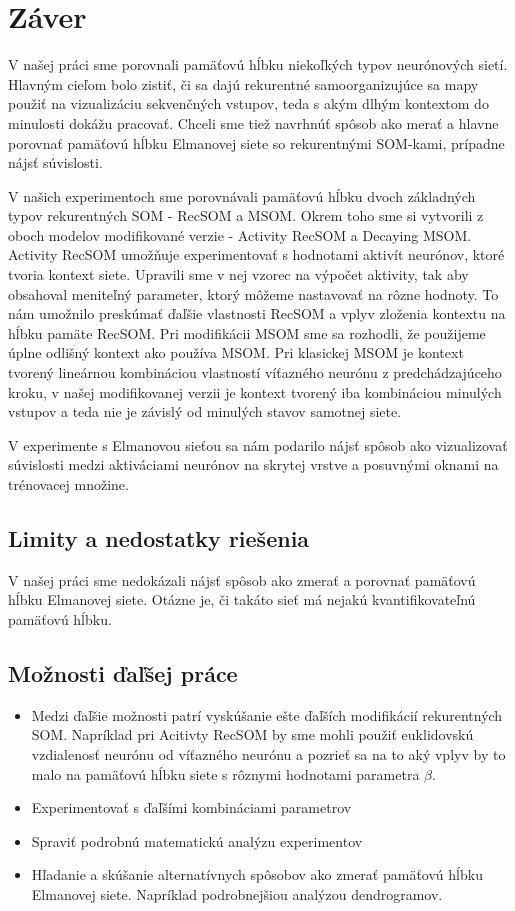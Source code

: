 \chapter*{Záver}
V našej práci sme porovnali pamäťovú hĺbku niekoľkých typov neurónových sietí.
Hlavným cieľom bolo zistiť, či sa dajú rekurentné samoorganizujúce sa mapy použiť na vizualizáciu
sekvenčných vstupov, teda s akým dlhým kontextom do minulosti dokážu pracovať. Chceli sme tiež navrhnúť 
spôsob ako merať a hlavne porovnať pamäťovú hĺbku Elmanovej siete so rekurentnými SOM-kami, prípadne 
nájsť súvislosti.

V našich experimentoch sme porovnávali pamäťovú hĺbku dvoch základných typov rekurentných 
SOM - RecSOM a MSOM. Okrem toho sme si vytvorili z oboch modelov modifikované verzie - Activity RecSOM a Decaying MSOM.
Activity RecSOM umožňuje experimentovať s hodnotami aktivít neurónov, ktoré tvoria kontext siete. Upravili sme v nej
vzorec na výpočet aktivity, tak aby obsahoval meniteľný parameter, ktorý môžeme nastavovať na rôzne hodnoty.
To nám umožnilo preskúmať ďaľšie vlastnosti RecSOM a vplyv zloženia kontextu na hĺbku pamäte RecSOM.
Pri modifikácii MSOM sme sa rozhodli, že použijeme úplne odlišný kontext ako používa MSOM. Pri klasickej MSOM
je kontext tvorený lineárnou kombináciou vlastností víťazného neurónu z predchádzajúceho kroku, v našej modifikovanej 
verzii je kontext tvorený iba kombináciou minulých vstupov a teda nie je závislý od minulých stavov samotnej siete.

V experimente s Elmanovou sieťou sa nám podarilo nájsť spôsob ako vizualizovať súvislosti medzi 
aktiváciami neurónov na skrytej vrstve a posuvnými oknami na trénovacej množine.

\section{Limity a nedostatky riešenia}
V našej práci sme nedokázali nájsť spôsob ako zmerať a porovnať pamäťovú hĺbku Elmanovej siete.
Otázne je, či takáto sieť má nejakú kvantifikovateľnú pamäťovú hĺbku. 


\section{Možnosti ďaľšej práce}
\begin{itemize}
    \item Medzi ďaľšie možnosti patrí vyskúšanie ešte ďaľších modifikácií rekurentných SOM. Napríklad pri Acitivty RecSOM 
    by sme mohli použiť euklidovskú vzdialenosť neurónu od víťazného neurónu a pozrieť sa na to aký vplyv by to malo 
    na pamäťovú hĺbku siete s rôznymi hodnotami parametra $\beta$.
    \item Experimentovať s ďaľšími kombináciami parametrov
    \item Spraviť podrobnú matematickú analýzu experimentov
    \item Hľadanie a skúšanie alternatívnych spôsobov ako zmerať pamäťovú hĺbku Elmanovej siete. Napríklad podrobnejšiou
    analýzou dendrogramov.
\end{itemize}





